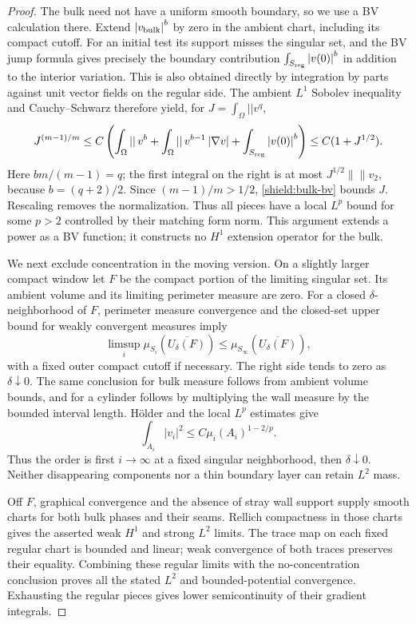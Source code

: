 \documentclass[11pt]{article}
\numberwithin{equation}{section}
\theoremstyle{definition}
\theoremstyle{remark}
\begin{document}
\begin{proof}
The bulk need not have a uniform smooth boundary, so we use a BV
calculation there.  Extend $\left\lvert{v_{\rm bulk}}\right\rvert^b$ by zero in the ambient
chart, including its compact cutoff.  For an initial test its support
misses the singular set, and the BV jump formula gives precisely the
boundary contribution $\int_{S_{\rm reg}}\left\lvert{v(0)}\right\rvert^b$ in addition to the
interior variation.  This is also obtained directly by integration by
parts against unit vector fields on the regular side.  The ambient
$L^1$ Sobolev inequality and Cauchy--Schwarz therefore yield, for
$J=\int_\Omega\left\lvert{}\right\rvert v^q$,
\begin{equation}\label{shield:bulk-bv}
 J^{(m-1)/m}
 \le C\left(
       \int_\Omega\left\lvert{}\right\rvert v^b+
       \int_\Omega\left\lvert{}\right\rvert v^{b-1}\left\lvert{\nabla v}\right\rvert
       +\int_{S_{\rm reg}}\left\lvert{v(0)}\right\rvert^b\right)
 \le C(1+J^{1/2}).
\end{equation}
Here $bm/(m-1)=q$; the first integral on the right is at most
$J^{1/2}\left\lVert{}\right\rVert v_2$, because $b=(q+2)/2$.  Since $(m-1)/m>1/2$, \cref{shield:bulk-bv} bounds $J$.
Rescaling removes the normalization.  Thus all pieces have a local
$L^p$ bound for some $p>2$ controlled by their matching form norm.
This argument extends a power as a BV function; it constructs no
$H^1$ extension operator for the bulk.

We next exclude concentration in the moving version.  On a slightly
larger compact window let $F$ be the compact portion of the limiting
singular set.  Its ambient volume and its limiting perimeter measure
are zero.  For a closed $\delta$-neighborhood of $F$, perimeter measure
convergence and the closed-set upper bound for weakly convergent
measures imply
\[
 \limsup_i\mu_{S_i}(\overline{U_\delta(F)})
       \le \mu_{S_\infty}(\overline{U_\delta(F)}),
\]
with a fixed outer compact cutoff if necessary.  The right side tends
to zero as $\delta\downarrow0$.  The same conclusion for bulk measure
follows from ambient volume bounds, and for a cylinder follows by
multiplying the wall measure by the bounded interval length.  H\"older
and the local $L^p$ estimates give
\[
 \int_{A_i}\left\lvert{v_i}\right\rvert^2
 \le C\mu_i(A_i)^{1-2/p}.
\]
Thus the order is first $i\to\infty$ at a fixed singular neighborhood,
then $\delta\downarrow0$.  Neither disappearing components nor a thin
boundary layer can retain $L^2$ mass.

Off $F$, graphical convergence and the absence of stray wall support
supply smooth charts for both bulk phases and their seams.  Rellich
compactness in those charts gives the asserted weak $H^1$ and strong
$L^2$ limits.  The trace map on each fixed regular chart is bounded and
linear; weak convergence of both traces preserves their equality.
Combining these regular limits with the no-concentration conclusion
proves all the stated $L^2$ and bounded-potential convergence.  Exhausting
the regular pieces gives lower semicontinuity of their gradient
integrals.


\end{proof}
\end{document}
